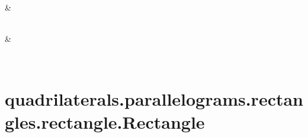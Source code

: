 \documentclass[letterpaper,10pt,english]{sphinxmanual}
\begin{document}
\begin{fulllineitems}
\begin{savenotes}
\begin{longtable}[c]{}
\endhead

\hline
{}\\
\endfoot

\endlastfoot

&

\\
\hline
{}
&

\\
\hline
\end{longtable}\sphinxatlongtableend\end{savenotes}

\end{fulllineitems}



\section{quadrilaterals.parallelograms.rectangles.rectangle.Rectangle}
\label{\detokenize{_autosummary/quadrilaterals.parallelograms.rectangles.rectangle.Rectangle:quadrilaterals-parallelograms-rectangles-rectangle-rectangle}}\label{\detokenize{_autosummary/quadrilaterals.parallelograms.rectangles.rectangle.Rectangle::doc}}
\end{document}
